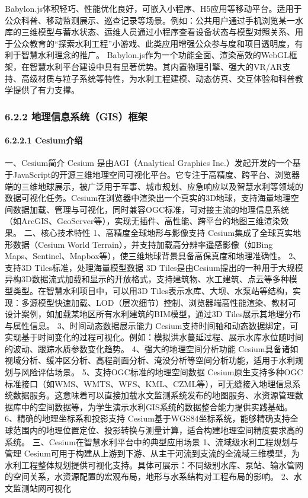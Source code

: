 Babylon.js体积轻巧、性能优化良好，可嵌入小程序、H5应用等移动平台。适用于公众科普、移动监测展示、巡查记录等场景。例如：公共用户通过手机浏览某一水库的三维模型与蓄水状态、运维人员通过小程序查看设备状态与模型对照关系、用于公众教育的``探索水利工程''小游戏、此类应用增强公众参与度和项目透明度，有利于智慧水利理念的推广。 Babylon.js作为一个功能全面、渲染高效的WebGL框架，在智慧水利平台建设中具有显著优势。其内置物理引擎、强大的VR/AR支持、高级材质与粒子系统等特性，为水利工程建模、动态仿真、交互体验和科普教学提供了有力支撑。 \subsubsection{6.2.2 地理信息系统（GIS）框架}\label{ux5730ux7406ux4fe1ux606fux7cfbux7edfgisux6846ux67b6} \paragraph{6.2.2.1 Cesium介绍}\label{cesiumux4ecbux7ecd} 一、Cesium简介 Cesium 是由AGI（Analytical Graphics Inc.）发起开发的一个基于JavaScript的开源三维地理空间可视化平台。它专注于高精度、跨平台、浏览器端的三维地球展示，被广泛用于军事、城市规划、应急响应以及智慧水利等领域的数据可视化任务。Cesium在浏览器中渲染出一个真实的3D地球，支持海量地理空间数据加载、管理与可视化，同时兼容OGC标准，可对接主流的地理信息系统（如ArcGIS、GeoServer等），实现无插件、高性能、跨平台的地图三维渲染效果。 二、核心技术特性 1、高精度全球地形与影像支持 Cesium集成了全球真实地形数据（Cesium World Terrain），并支持加载高分辨率遥感影像（如Bing Maps、Sentinel、Mapbox等），使三维地球背景具备高保真度和地理准确性。 2、支持3D Tiles标准，处理海量模型数据 3D Tiles是由Cesium提出的一种用于大规模异构3D数据流式加载和显示的开放格式，支持建筑物、水工建筑、点云等多种模型类型。在智慧水利项目中，可以用3D Tiles表示水库、大坝、水泵站等结构，实现：多源模型快速加载、LOD（层次细节）控制、浏览器端高性能渲染、教材可设计案例，如加载某地区所有水利建筑的BIM模型，通过3D Tiles展示其地理分布与属性信息。 3、时间动态数据展示能力 Cesium支持时间轴和动态数据绑定，可实现基于时间变化的过程可视化。例如：模拟洪水蔓延过程、展示水库水位随时间的波动、跟踪水质参数变化趋势。 4、强大的地理空间分析功能 Cesium具备诸如视域分析、缓冲区分析、高程剖面分析、淹没分析等空间分析功能，适用于水利规划与风险评估场景。 5、支持OGC标准的地理空间数据 Cesium原生支持多种OGC标准接口（如WMS、WMTS、WFS、KML、CZML等），可无缝接入地理信息系统数据服务。这意味着可以直接加载水文监测系统发布的地图服务、水资源管理数据库中的空间数据等，为学生演示水利GIS系统的数据整合能力提供实践基础。 6、精确的地理坐标系和投影支持 Cesium基于WGS84坐标系统，能够精确支持全球范围内的地理位置定位、投影转换与测量计算，适合构建地理空间精度要求高的系统。 三、Cesium在智慧水利平台中的典型应用场景 1、流域级水利工程规划与管理 Cesium可用于构建从上游到下游、从主干河流到支流的全流域三维模型，为水利工程整体规划提供可视化支持。具体可展示：不同级别水库、泵站、输水管网的空间关系，水资源配置的宏观布局，地形与水系结构对工程布局的影响。 2、水文监测站网可视化 
